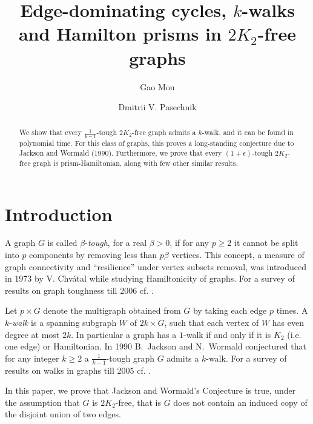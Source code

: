 \documentclass{amsart}
\theoremstyle{definition}
\begin{document}
\author{Gao Mou}
\address{School of Physical and Mathematical Sciences, Nanyang Technological University, Singapore} 
\author{Dmitrii V. Pasechnik}
\address{Department of Computer Science, The University of Oxford, UK}

\title[Dominating cycles, $k$-walks and Hamilton prisms in $2K_2$-free graphs]
{Edge-dominating cycles, $k$-walks and Hamilton prisms in $2K_2$-free graphs}
\begin{abstract}
We show that every $\frac{1}{k-1}$-tough
$2K_2$-free graph admits a $k$-walk, and it can be found in polynomial time.
For this class of graphs, this proves a
long-standing conjecture due to Jackson and Wormald (1990).
Furthermore, we prove that every $(1+\epsilon)$-tough $2K_2$-free graph is prism-Hamiltonian,
along with few other similar results.
\end{abstract}

\maketitle

\section{Introduction}
A graph $G$ is called $\beta$-{\em tough}, for a real $\beta>0$, if for any $p\geq 2$ it
cannot be split into $p$ components by removing less than $p\beta$ vertices.  
This concept, a measure of graph connectivity and ``resilience'' under vertex subsets removal,
was introduced in 1973 by V. Chv\'{a}tal 
while studying   Hamiltonicity of graphs. For a survey of results on graph toughness till 2006
cf. \cite{MR2221006}.

Let $p\times G$ denote the multigraph obtained from $G$ by taking each edge $p$ times. 
A $k$-{\em walk} is a spanning subgraph $W$ of $2k\times G$, such that each vertex of $W$ 
has even degree at most $2k$. %
In particular a graph has a $1$-walk if and only if it is $K_2$ (i.e. one edge) or Hamiltonian.
In 1990 B.~Jackson and N.~Wormald conjectured \cite{jackson1990k} that for any integer $k\ge2$ a
$\frac{1}{k-1}$-tough graph $G$ admits a $k$-walk.
{For a survey of results on walks in graphs till 2005 cf. \cite{kouider2005connected}.}

In this paper, we prove that Jackson and Wormald's Conjecture is true, under the
assumption that $G$ is  $2K_2$-free, that is $G$ does not contain an induced
copy of the disjoint union of two edges. 
\end{document}
